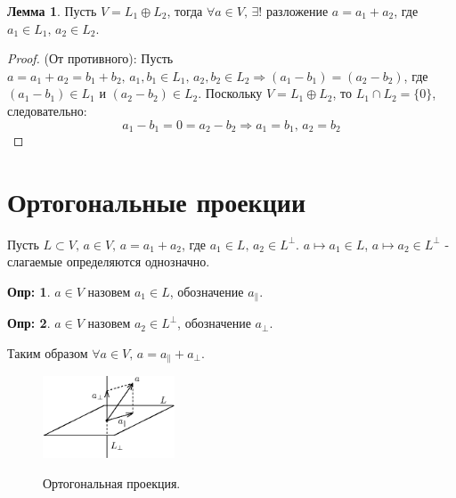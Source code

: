 \documentclass[12pt]{article}
\theoremstyle{definition}
\newtheorem{defn}{Опр:}
\newtheorem{lemma}{Лемма}
\begin{document}
\begin{lemma}
	Пусть $V = L_1 \oplus L_2$, тогда $\forall a \in V, \, \exists !$ разложение $a = a_1 + a_2$, где $a_1 \in L_1, \, a_2 \in L_2$.
\end{lemma}
\begin{proof}(От противного):
	Пусть $a = a_1 + a_2 = b_1 + b_2, \, a_1,b_1 \in L_1, \, a_2,b_2 \in L_2 \Rightarrow (a_1 - b_1) = (a_2 - b_2)$, где $(a_1 - b_1) \in L_1$ и $(a_2 - b_2) \in L_2$. Поскольку $V = L_1 \oplus L_2$, то $L_1 \cap L_2 = \{0\}$, следовательно: 
	$$
		a_1 - b_1 = 0 = a_2 - b_2 \Rightarrow a_1 = b_1, \, a_2 = b_2
	$$
\end{proof}

\section*{Ортогональные проекции}

Пусть $L \subset V, \, a \in V, \, a = a_1 + a_2$, где $a_1 \in L, \, a_2 \in L^\bot$. $a \mapsto a_1 \in L$, $a \mapsto a_2 \in L^\bot$ - слагаемые определяются однозначно.

\begin{defn}
	 $a \in V$ назовем $a_1 \in L$, обозначение $a_{\|}$.
\end{defn}
\begin{defn}
	 $a \in V$ назовем $a_2 \in L^\bot$, обозначение $a_\bot$.
\end{defn}

Таким образом $\forall a \in V, \, a = a_{\|} + a_\bot$.

\begin{figure}[H]
	\centering
	\includegraphics[width=0.35\textwidth]{6_1.eps}
	\label{6_1}
	\caption{Ортогональная проекция.}
	\label{fig:Ортогональная проекция}
\end{figure}
\end{document}
